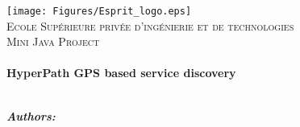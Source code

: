 
\begin{titlepage}
  \begin{center}
    \texttt{[image: Figures/Esprit\_logo.eps]}
    \\[1cm]

    {
      \textsc
      {
        \LARGE
        Ecole Supérieure privée d'ingénierie et de technologies
      }
    }
    \\[1cm]
    {
      \textsc
      {
        \Large
        Mini Java Project
      }
    }
    \\[0.5cm]
    \HRule
    \\[0.5cm]

    {
      \huge\bfseries
      HyperPath GPS based service discovery
    }
    \\[0.5cm]
    \HRule
    \\[1.5cm]

    \begin{minipage}{0.4\textwidth}
      \begin{flushleft}
        \large
        \makebox
        {
          \textbf
          {
            \emph{Authors:}
          }
        }
        \\
        {
          \addtolength{\leftskip}{3mm}
          \\
          \\
        }
      \end{flushleft}
    \end{minipage}
    \begin{minipage}{0.4\textwidth}
      \begin{flushright} \large
        \begin{flushleft}
              \\
          {
            \addtolength{\leftskip}{3mm}
                                     \\
            \\
          }
        \end{flushleft}
      \end{flushright}
    \end{minipage}


\end{center}
\end{titlepage}
